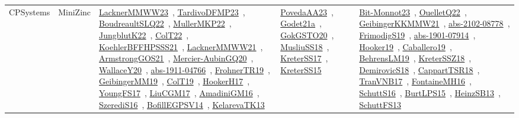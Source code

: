 {\begin{longtable}{lp{3cm}>{\raggedright\arraybackslash}p{6cm}>{\raggedright\arraybackslash}p{6cm}>{\raggedright\arraybackslash}p{8cm}}
CPSystems & MiniZinc & \href{../works/LacknerMMWW23.pdf}{LacknerMMWW23}~\cite{LacknerMMWW23}, \href{../works/TardivoDFMP23.pdf}{TardivoDFMP23}~\cite{TardivoDFMP23}, \href{../works/BoudreaultSLQ22.pdf}{BoudreaultSLQ22}~\cite{BoudreaultSLQ22}, \href{../works/MullerMKP22.pdf}{MullerMKP22}~\cite{MullerMKP22}, \href{../works/JungblutK22.pdf}{JungblutK22}~\cite{JungblutK22}, \href{../works/ColT22.pdf}{ColT22}~\cite{ColT22}, \href{../works/KoehlerBFFHPSSS21.pdf}{KoehlerBFFHPSSS21}~\cite{KoehlerBFFHPSSS21}, \href{../works/LacknerMMWW21.pdf}{LacknerMMWW21}~\cite{LacknerMMWW21}, \href{../works/ArmstrongGOS21.pdf}{ArmstrongGOS21}~\cite{ArmstrongGOS21}, \href{../works/Mercier-AubinGQ20.pdf}{Mercier-AubinGQ20}~\cite{Mercier-AubinGQ20}, \href{../works/WallaceY20.pdf}{WallaceY20}~\cite{WallaceY20}, \href{../works/abs-1911-04766.pdf}{abs-1911-04766}~\cite{abs-1911-04766}, \href{../works/FrohnerTR19.pdf}{FrohnerTR19}~\cite{FrohnerTR19}, \href{../works/GeibingerMM19.pdf}{GeibingerMM19}~\cite{GeibingerMM19}, \href{../works/ColT19.pdf}{ColT19}~\cite{ColT19}, \href{../works/HookerH17.pdf}{HookerH17}~\cite{HookerH17}, \href{../works/YoungFS17.pdf}{YoungFS17}~\cite{YoungFS17}, \href{../works/LiuCGM17.pdf}{LiuCGM17}~\cite{LiuCGM17}, \href{../works/AmadiniGM16.pdf}{AmadiniGM16}~\cite{AmadiniGM16}, \href{../works/SzerediS16.pdf}{SzerediS16}~\cite{SzerediS16}, \href{../works/BofillEGPSV14.pdf}{BofillEGPSV14}~\cite{BofillEGPSV14}, \href{../works/KelarevaTK13.pdf}{KelarevaTK13}~\cite{KelarevaTK13} & \href{../works/PovedaAA23.pdf}{PovedaAA23}~\cite{PovedaAA23}, \href{../works/Godet21a.pdf}{Godet21a}~\cite{Godet21a}, \href{../works/GokGSTO20.pdf}{GokGSTO20}~\cite{GokGSTO20}, \href{../works/MusliuSS18.pdf}{MusliuSS18}~\cite{MusliuSS18}, \href{../works/KreterSS17.pdf}{KreterSS17}~\cite{KreterSS17}, \href{../works/KreterSS15.pdf}{KreterSS15}~\cite{KreterSS15} & \href{../works/Bit-Monnot23.pdf}{Bit-Monnot23}~\cite{Bit-Monnot23}, \href{../works/OuelletQ22.pdf}{OuelletQ22}~\cite{OuelletQ22}, \href{../works/GeibingerKKMMW21.pdf}{GeibingerKKMMW21}~\cite{GeibingerKKMMW21}, \href{../works/abs-2102-08778.pdf}{abs-2102-08778}~\cite{abs-2102-08778}, \href{../works/FrimodigS19.pdf}{FrimodigS19}~\cite{FrimodigS19}, \href{../works/abs-1901-07914.pdf}{abs-1901-07914}~\cite{abs-1901-07914}, \href{../works/Hooker19.pdf}{Hooker19}~\cite{Hooker19}, \href{../works/Caballero19.pdf}{Caballero19}~\cite{Caballero19}, \href{../works/BehrensLM19.pdf}{BehrensLM19}~\cite{BehrensLM19}, \href{../works/KreterSSZ18.pdf}{KreterSSZ18}~\cite{KreterSSZ18}, \href{../works/DemirovicS18.pdf}{DemirovicS18}~\cite{DemirovicS18}, \href{../works/CappartTSR18.pdf}{CappartTSR18}~\cite{CappartTSR18}, \href{../works/TranVNB17.pdf}{TranVNB17}~\cite{TranVNB17}, \href{../works/FontaineMH16.pdf}{FontaineMH16}~\cite{FontaineMH16}, \href{../works/SchuttS16.pdf}{SchuttS16}~\cite{SchuttS16}, \href{../works/BurtLPS15.pdf}{BurtLPS15}~\cite{BurtLPS15}, \href{../works/HeinzSB13.pdf}{HeinzSB13}~\cite{HeinzSB13}, \href{../works/SchuttFS13.pdf}{SchuttFS13}~\cite{SchuttFS13}\\

\end{longtable}}
